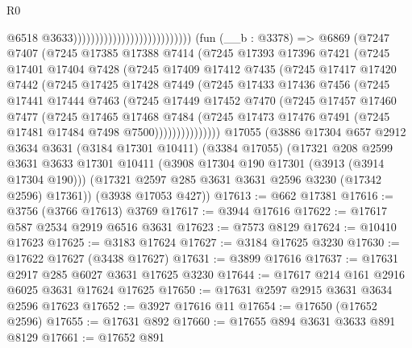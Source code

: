 \begin{lexlean}{R0}
\begin{coremodule}
                                                          @6518
                                                          @3633)))))))))))))))))))))))))))
    (fun (__b : @3378) =>
    @6869
      (@7247
        @7407
        (@7245
          @17385
          @17388
          @7414
          (@7245
            @17393
            @17396
            @7421
            (@7245
              @17401
              @17404
              @7428
              (@7245
                @17409
                @17412
                @7435
                (@7245
                  @17417
                  @17420
                  @7442
                  (@7245
                    @17425
                    @17428
                    @7449
                    (@7245
                      @17433
                      @17436
                      @7456
                      (@7245
                        @17441
                        @17444
                        @7463
                        (@7245
                          @17449
                          @17452
                          @7470
                          (@7245
                            @17457
                            @17460
                            @7477
                            (@7245
                              @17465
                              @17468
                              @7484
                              (@7245
                                @17473
                                @17476
                                @7491
                                (@7245 @17481 @17484 @7498 @7500)))))))))))))))
    @17055
    (@3886
      @17304
      @657
      @2912
      @3634
      @3631
      (@3184 @17301 @10411)
      (@3384 @17055)
      (@17321
        @208
        @2599
        @3631
        @3633
        @17301
        @10411
        (@3908 @17304 @190 @17301 (@3913 (@3914 @17304 @190)))
        (@17321 @2597 @285 @3631 @3631 @2596 @3230 (@17342 @2596) @17361))
      (@3938 @17053 @427))
@17613 := @662 @17381
@17616 := @3756 (@3766 @17613) @3769
@17617 := @3944 @17616
@17622 := @17617 @587 @2534 @2919 @6516 @3631
@17623 := @7573 @8129
@17624 := @10410 @17623
@17625 := @3183 @17624
@17627 := @3184 @17625 @3230
@17630 := @17622 @17627 (@3438 @17627)
@17631 := @3899 @17616
@17637 := @17631 @2917 @285 @6027 @3631 @17625 @3230
@17644 := @17617 @214 @161 @2916 @6025 @3631 @17624 @17625
@17650 := @17631 @2597 @2915 @3631 @3634 @2596 @17623
@17652 := @3927 @17616 @11
@17654 := @17650 (@17652 @2596)
@17655 := @17631 @892
@17660 := @17655 @894 @3631 @3633 @891 @8129
@17661 := @17652 @891

\end{coremodule}
\end{lexlean}

